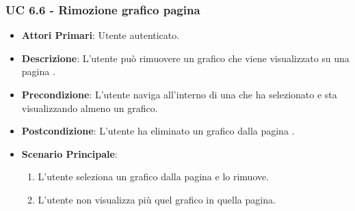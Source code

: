 			\subsubsection{UC 6.6 - Rimozione grafico pagina }
			\begin{itemize}
				\item \textbf{Attori Primari}: Utente autenticato.
				\item \textbf{Descrizione}: L'utente può rimuovere un grafico che viene visualizzato su una pagina .
				\item \textbf{Precondizione}: L'utente naviga all'interno di una  che ha selezionato e sta visualizzando almeno un grafico.
				\item \textbf{Postcondizione}: L'utente ha eliminato un grafico dalla pagina  .
				\item \textbf{Scenario Principale}:
				\begin{enumerate}
					\item{L'utente seleziona un grafico dalla pagina  e lo rimuove.}
					\item{L'utente non visualizza più quel grafico in quella pagina.}
				\end{enumerate}	
			\end{itemize}